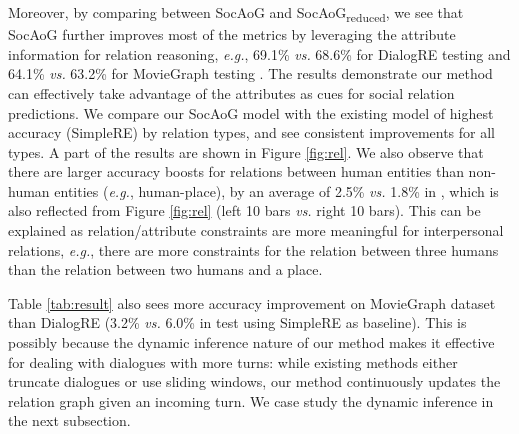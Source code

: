 \documentclass[11pt,a4paper]{article}
\begin{document}
Moreover, by comparing between SocAoG and SocAoG\textsubscript{reduced}, we see that SocAoG further improves most of the metrics by leveraging the attribute information for relation reasoning, \textit{e.g.}, 69.1\% \textit{vs.} 68.6\% for DialogRE testing  and 64.1\% \textit{vs.} 63.2\% for MovieGraph testing . The results demonstrate our method can effectively take advantage of the attributes as cues for social relation predictions. 
We compare our SocAoG model with the existing model of highest accuracy (SimpleRE) by relation types, and see consistent improvements for all types. A part of the results are shown in Figure \ref{fig:rel}. 
We also observe that there are larger accuracy boosts for relations between human entities than non-human entities (\textit{e.g.}, human-place), by an average of 2.5\% \textit{vs.} 1.8\% in , which is also reflected from Figure \ref{fig:rel} (left 10 bars \textit{vs.} right 10 bars). 
This can be explained as relation/attribute constraints are more meaningful for interpersonal relations, \textit{e.g.}, there are more constraints for the relation between three humans than the relation between two humans and a place.

Table \ref{tab:result} also sees more accuracy improvement on MovieGraph dataset than DialogRE (3.2\% \textit{vs.} 6.0\% in test  using SimpleRE as baseline). This is possibly because the dynamic inference nature of our method makes it effective for dealing with dialogues with more turns: while existing methods either truncate dialogues or use sliding windows, our method continuously updates the relation graph given an incoming turn. We case study the dynamic inference in the next subsection. 
\end{document}
